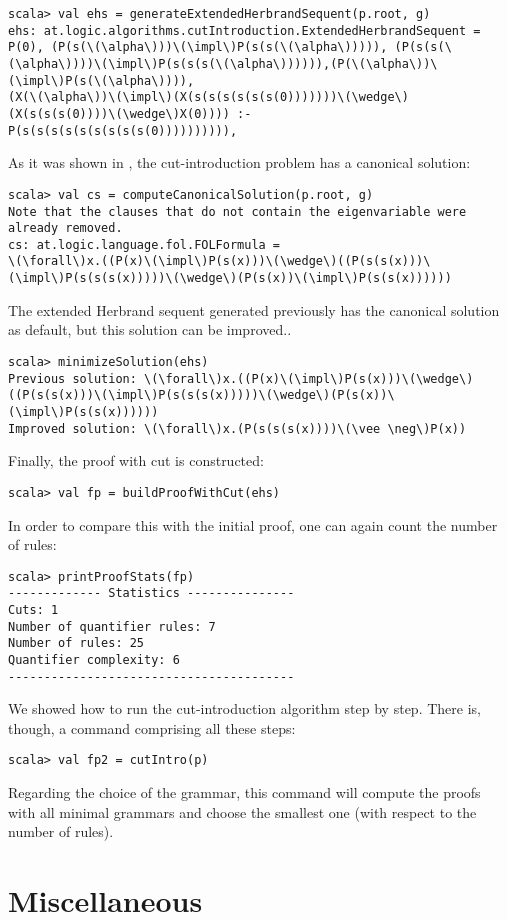 \documentclass[a4paper,11pt]{article}
\newcommand{\impl}{\supset} %
\begin{document}
\begin{lstlisting}
scala> val ehs = generateExtendedHerbrandSequent(p.root, g)
ehs: at.logic.algorithms.cutIntroduction.ExtendedHerbrandSequent = 
P(0), (P(s(\(\alpha\)))\(\impl\)P(s(s(\(\alpha\))))), (P(s(s(\(\alpha\))))\(\impl\)P(s(s(s(\(\alpha\)))))),(P(\(\alpha\))\(\impl\)P(s(\(\alpha\)))),
(X(\(\alpha\))\(\impl\)(X(s(s(s(s(s(s(0)))))))\(\wedge\)(X(s(s(s(0))))\(\wedge\)X(0)))) :- 
P(s(s(s(s(s(s(s(s(s(0)))))))))),
\end{lstlisting}
As it was shown in \cite{HetzlXXAlgorithmic}, the cut-introduction problem has a
canonical solution:
\begin{lstlisting}
scala> val cs = computeCanonicalSolution(p.root, g)
Note that the clauses that do not contain the eigenvariable were already removed.
cs: at.logic.language.fol.FOLFormula = 
\(\forall\)x.((P(x)\(\impl\)P(s(x)))\(\wedge\)((P(s(s(x)))\(\impl\)P(s(s(s(x)))))\(\wedge\)(P(s(x))\(\impl\)P(s(s(x))))))
\end{lstlisting}
The extended Herbrand sequent generated previously has the canonical solution as
default, but this solution can be improved.. 
\begin{lstlisting}
scala> minimizeSolution(ehs)
Previous solution: \(\forall\)x.((P(x)\(\impl\)P(s(x)))\(\wedge\)((P(s(s(x)))\(\impl\)P(s(s(s(x)))))\(\wedge\)(P(s(x))\(\impl\)P(s(s(x))))))
Improved solution: \(\forall\)x.(P(s(s(s(x))))\(\vee \neg\)P(x))
\end{lstlisting}
Finally, the proof with cut is constructed:
\begin{lstlisting}
scala> val fp = buildProofWithCut(ehs)
\end{lstlisting}
In order to compare this with the initial proof, one can again count
the number of rules:
\begin{lstlisting}
scala> printProofStats(fp)
------------- Statistics ---------------
Cuts: 1
Number of quantifier rules: 7
Number of rules: 25
Quantifier complexity: 6
----------------------------------------
\end{lstlisting}
We showed how to run the cut-introduction algorithm step by step. There is,
though, a command comprising all these steps:
\begin{lstlisting}
scala> val fp2 = cutIntro(p)
\end{lstlisting}
Regarding the choice of the grammar, this command will compute the proofs with
all minimal grammars and choose the smallest one (with respect to the number of rules).


\section{Miscellaneous}
\end{document}
